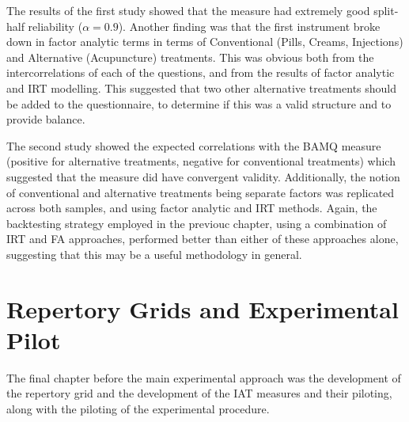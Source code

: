 The results of the first study showed that the measure had extremely good split-half reliability ($ \alpha=0.9$). Another finding was that the first instrument broke down in factor analytic terms in terms of Conventional (Pills, Creams, Injections) and Alternative (Acupuncture) treatments. This was obvious both from the intercorrelations of each of the questions, and from the results of factor analytic and IRT modelling. This suggested that two other alternative treatments should be added to the questionnaire, to determine if this was a valid structure and to provide balance. 

The second study showed the expected correlations  with the BAMQ measure (positive for alternative treatments, negative for conventional treatments) which suggested that the measure did have convergent validity. Additionally, the notion of conventional and alternative treatments being separate factors was replicated across both samples, and using factor analytic and IRT methods. Again, the backtesting strategy employed in the previouc chapter, using a combination of IRT and FA approaches, performed better than either of these approaches alone, suggesting that this may be a useful methodology in general. 


\section{Repertory Grids and Experimental Pilot}
\label{sec:qual-rese-rep}

The final chapter before the main experimental approach was the development of the repertory grid and the development of the IAT measures and their piloting, along with the piloting of the experimental procedure. 


